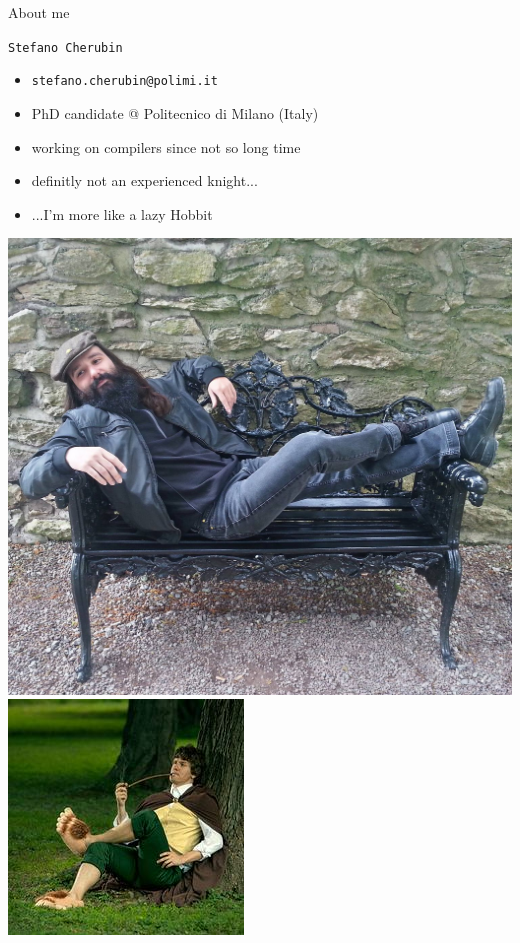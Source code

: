 \documentclass[10pt,mathserif]{beamer}
\begin{document}
\begin{frame}[t]{About me}
  \begin{huge}
    \texttt{Stefano Cherubin}
  \end{huge}
  \begin{itemize}
    \item \texttt{stefano.cherubin@polimi.it}
    \item PhD candidate @ Politecnico di Milano (Italy)
    \item working on compilers since not so long time
    \item definitly not an experienced knight...
    \pause
    \item ...I'm more like a lazy Hobbit
  \end{itemize}
  \begin{center}
    \includegraphics[height=.35\textheight]{img/00/lazy_hobbit.jpg}
    \hspace{.1\textwidth}
    \includegraphics[height=.35\textheight]{img/00/lazy_hobbit_2.jpg}
  \end{center}
\end{frame}
\end{document}
